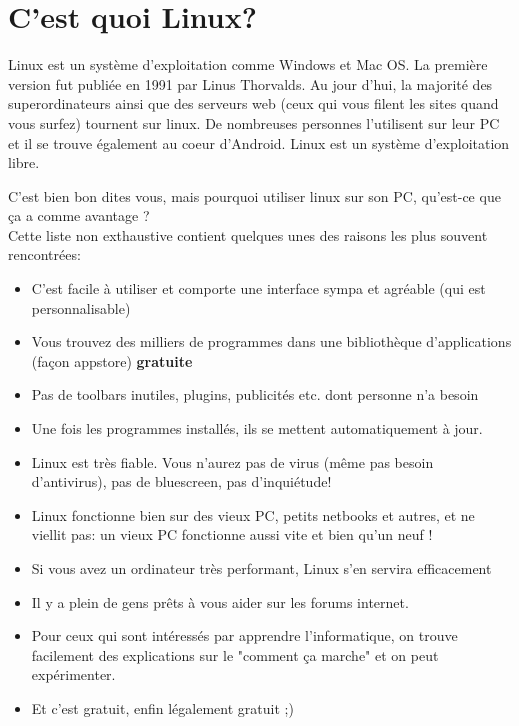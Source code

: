\documentclass[11pt]{../fiche}
\begin{document}

\section*{C'est quoi Linux?}

Linux est un système d'exploitation comme Windows et Mac OS. La première version fut publiée en 1991 par Linus Thorvalds.
Au jour d'hui, la majorité des superordinateurs ainsi que des serveurs web (ceux qui vous filent les sites quand vous surfez)
tournent sur linux. De nombreuses personnes l'utilisent sur leur PC et il se trouve également au coeur d'Android.
Linux est un système d'exploitation libre.
\vspace{0.5cm}

C'est bien bon dites vous, mais pourquoi utiliser linux sur son PC, qu'est-ce que ça a comme avantage ?\\
Cette liste non exthaustive contient quelques unes des raisons les plus souvent rencontrées:
\begin{itemize}
    \item C'est facile à utiliser et comporte une interface sympa et agréable (qui est personnalisable)
    \item Vous trouvez des milliers de programmes dans une bibliothèque d'applications (façon appstore) \textbf{gratuite}
    \item Pas de toolbars inutiles, plugins, publicités etc. dont personne n'a besoin
    \item Une fois les programmes installés, ils se mettent automatiquement à jour.
    \item Linux est très fiable. Vous n'aurez pas de virus (même pas besoin d'antivirus),
        pas de bluescreen, pas d'inquiétude!
    \item Linux fonctionne bien sur des vieux PC, petits netbooks et autres, et
        ne viellit pas: un vieux PC fonctionne aussi vite et bien qu'un neuf !
    \item Si vous avez un ordinateur très performant, Linux s'en servira efficacement
    \item Il y a plein de gens prêts à vous aider sur les forums internet.
    \item Pour ceux qui sont intéressés par apprendre l'informatique, on trouve
        facilement des explications sur le "comment ça marche" et on peut
        expérimenter.
    \item Et c'est gratuit, enfin légalement gratuit ;)
\end{itemize}
\end{document}
